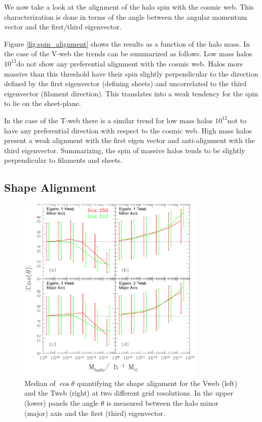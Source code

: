 \documentclass[usenatbib]{mn2e}
\newcommand{\hMsun}{{\ifmmode{h^{-1}{\rm
        {M_{\odot}}}}\else{$h^{-1}{\rm{M_{\odot}}}$}\fi}}
\begin{document}
We now take a look at the alignment of the halo spin with the cosmic
web. This characterization is done in terms of the angle between the
angular momentum vector and the first/third eigenvector.

Figure \ref{fig:spin_alignment} shows the results as a function of
the halo mass. In the case of the V-web the trends can be summarized
as follows. Low mass halos $10^{12}$\hMsun do not show any
preferential alignment with the cosmic web. Halos more massive than
this threshold have their spin slightly perpendicular to the
direction defined by the first eigenvector (defining sheets) and
uncorrelated to the third eigenvector (filament direction). This
translates into a weak tendency for the spin to lie on the
sheet-plane. 

In the case of the T-web there is a similar trend for low mass halos
$10^{12}$\hMsun not to have any preferential direction with respect to
the cosmic web. High mass halos present a weak alignment with the
first eigen vector and anti-alignment with the third
eigenvector. Summarizing, the spin of massive halos tends to be
slightly perpendicular to filaments and sheets.




\subsection{Shape Alignment}

\begin{figure}
\includegraphics[width=0.80\textwidth]{Fig2.pdf}
\caption{Median of $\cos\theta$ quantifying the shape alignment for
  the Vweb (left) and the Tweb (right) at two different grid
  resolutions. In the upper (lower) panels the angle $\theta$ is
  measured between the halo minor (major) axis and the first (third)
  eigenvector.\label{fig:shape_alignment}} 
\end{figure}
\end{document}
